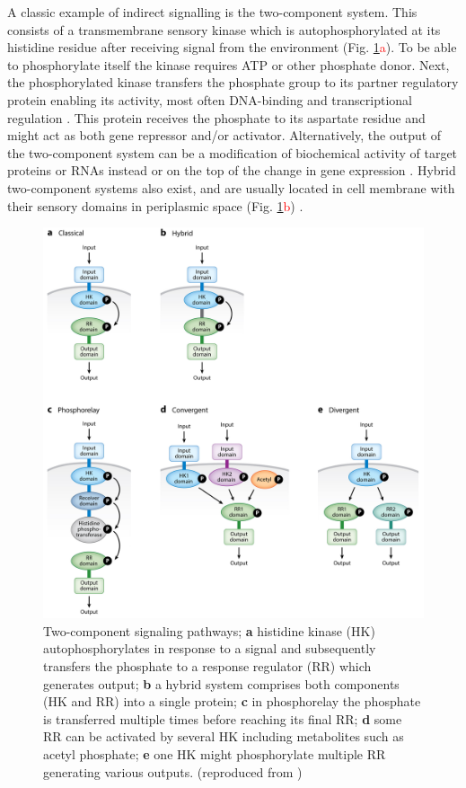 A classic example of indirect signalling is the two-component system.
This consists of a transmembrane sensory kinase which is autophosphorylated at its histidine residue after receiving signal from the environment (Fig. \ref{two}\textcolor{red}{a}).
To be able to phosphorylate itself the kinase requires ATP or other phosphate donor.
Next, the phosphorylated kinase transfers the phosphate group to its partner regulatory protein enabling its activity, most often DNA-binding and transcriptional regulation \cite{lynch2012prioritization, gao2015temporal, cui2018novel}.
This protein receives the phosphate to its aspartate residue and might act as both gene repressor and/or activator.
Alternatively, the output of the two-component system can be a modification of biochemical activity of target proteins or RNAs instead or on the top of the change in gene expression \cite{shu2002antar, chambonnier2016hybrid}.
Hybrid two-component systems also exist, and are usually located in cell membrane with their sensory domains in periplasmic space (Fig. \ref{two}\textcolor{red}{b}) \cite{lynch2012prioritization, hirano2013regulon}.

\begin{figure}[h!]
  \centering
  \includegraphics[scale=0.85]{text/Pictures/TwoComponent.jpeg}
	\caption{Two-component signaling pathways; \textbf{a} histidine kinase (HK) autophosphorylates in response to a signal and subsequently transfers the phosphate to a response regulator (RR) which generates output; \textbf{b} a hybrid system comprises both components (HK and RR) into a single protein; \textbf{c} in phosphorelay the phosphate is transferred multiple times before reaching its final RR; \textbf{d} some RR can be activated by several HK including metabolites such as acetyl phosphate; \textbf{e} one HK might phosphorylate multiple RR generating various outputs. (reproduced from \cite{groisman2016feedback})}
	\label{two}
\end{figure}

